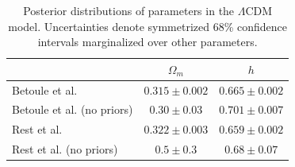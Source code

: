 \documentclass[12pt,a4paper]{article}
\newcommand\LC[1]{\todo[color=magenta!40, inline, size=\small]{LC: #1}}
\begin{document}
\begin{table}[h]
   \centering
    \begin{tabular}{l|cc}
    ~                          & $\Omega_m$ & $h$ \\ \hline
    Betoule et al.             & $0.315 \pm 0.002$      & $0.665 \pm 0.002$ \\
    Betoule et al. (no priors) & $0.30 \pm 0.03$      & $0.701 \pm 0.007$ \\
    Rest et al.                & $0.322 \pm 0.003$      & $0.659 \pm 0.002$ \\
    Rest et al. (no priors)    & $0.5 \pm 0.3$      & $0.68 \pm 0.07$ \\
    \end{tabular}
    \caption {\label{tab:lcdm}Posterior distributions of parameters in the
      $\Lambda$CDM model. Uncertainties denote symmetrized 68\%
      confidence intervals marginalized over other parameters.}
\end{table}
%
\end{document}
